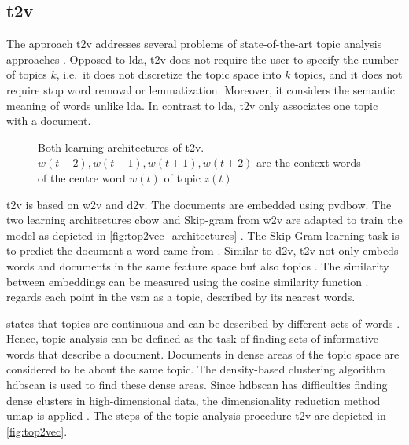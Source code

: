 \subsection{\acl*{t2v}}\label{subsec:top2vec}

The approach \ac{t2v} addresses several problems of state-of-the-art topic analysis approaches \cite{Top2Vec2020}.
Opposed to \ac{lda}, \ac{t2v} does not require the user to specify the number of topics $k$, 
i.e.\ it does not discretize the topic space into $k$ topics, 
and it does not require stop word removal or lemmatization.
Moreover, it considers the semantic meaning of words unlike \ac{lda}.
In contrast to \ac{lda}, \ac{t2v} only associates one topic with a document.

\begin{figure}%
    \centering
    \qquad
    \caption[Two learning architectures of \ac{t2v}]{Both learning architectures of \ac{t2v}.
    $w(t-2), w(t-1), w(t+1), w(t+2)$ are the context words of the centre word $w(t)$ of topic $z(t)$.
    }%
    \label{fig:top2vec_architectures}%
\end{figure}

\ac{t2v} is based on \ac{w2v} and \ac{d2v}.
The documents are embedded using \ac{pvdbow}.
The two learning architectures \ac{cbow} and Skip-gram from \ac{w2v} are adapted to train the model as depicted in \autoref{fig:top2vec_architectures} \cite{Topic2Vec2015}.
The Skip-Gram learning task is to predict the document a word came from \cite{Top2Vec2020, Topic2Vec2015}.
Similar to \ac{d2v}, \ac{t2v} not only embeds words and documents in the same feature space but also topics \cite{Top2Vec2020, Topic2Vec2015}.
The similarity between embeddings can be measured using the cosine similarity function \cite{Topic2Vec2015}.
\citeauthor{Top2Vec2020} regards each point in the \ac{vsm} as a topic, described by its nearest words.

\citeauthor{Top2Vec2020} states that topics are continuous and can be described by different sets of words \cite{Top2Vec2020}.
Hence, topic analysis can be defined as the task of finding sets of informative words that describe a document.
Documents in dense areas of the topic space are considered to be about the same topic.
The density-based clustering algorithm \ac{hdbscan} is used to find these dense areas.
Since \ac{hdbscan} has difficulties finding dense clusters in high-dimensional data, 
the dimensionality reduction method \ac{umap} is applied \cite{Top2Vec2020}.
The steps of the topic analysis procedure \ac{t2v} are depicted in \autoref{fig:top2vec}.


